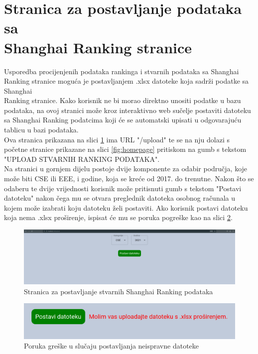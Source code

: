 \documentclass[times, utf8, zavrsni]{fer}
\begin{document}
\section{Stranica za postavljanje podataka sa \\Shanghai Ranking stranice}
Usporedba procijenjenih podataka rankinga i stvarnih podataka sa Shanghai Ranking stranice moguća je postavljanjem .xlsx datoteke koja sadrži 
podatke sa Shanghai \\Ranking stranice. Kako korisnik ne bi morao direktno unositi podatke u bazu podataka, na ovoj stranici može kroz 
interaktivno web sučelje postaviti datoteku sa Shanghai Ranking podatcima koji će se automatski upisati u odgovarajuću tablicu u bazi podataka.
\\Ova stranica prikazana na slici \ref{fig:upload} ima URL "/upload" te se na nju dolazi s početne stranice prikazane na slici \ref{fig:homepage} pritiskom na gumb s tekstom
"UPLOAD STVARNIH RANKING PODATAKA".
\\Na stranici u gornjem dijelu postoje dvije komponente za odabir područja, koje može biti CSE ili EEE, i godine, koja se kreće od 2017. do trenutne. Nakon što 
se odaberu te dvije vrijednosti korisnik može pritisnuti gumb s tekstom "Postavi datoteku" nakon čega mu se otvara preglednik datoteka osobnog računala
u kojem može izabrati koju datoteku želi postaviti. Ako korisnik postavi datoteku koja nema .xlsx proširenje, ispisat će mu se poruka pogreške kao na 
slici \ref{fig:error}.
\begin{figure}[htb]
    \hspace*{-2cm}  
       \includegraphics[scale=0.2]{upload.png} 
       \caption{Stranica za postavljanje stvarnih Shanghai Ranking podataka}
       \label{fig:upload}
       \end{figure} 
 \begin{figure}[htb]
        \centering
           \includegraphics[scale=0.2]{error.png} 
           \caption{Poruka greške u slučaju postavljanja neispravne datoteke}
           \label{fig:error}
           \end{figure}        
\end{document}
